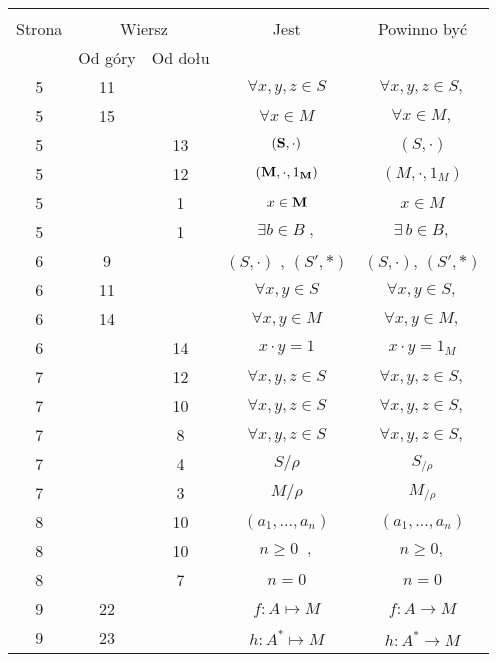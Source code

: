 \documentclass[a4paper,11pt]{article}
\begin{document}
\begin{center}

  \begin{tabular}{|c|c|c|c|c|}
    \hline
    & \multicolumn{2}{c|}{} & & \\
    Strona & \multicolumn{2}{c|}{Wiersz} & Jest
                              & Powinno być \\ \cline{2-3}
    & Od góry & Od dołu & & \\
    \hline
    5  & 11 & & $\forall x, y, z \in S$ & $\forall x, y, z \in S,$ \\
    5  & 15 & & $\forall x \in M$ & $\forall x \in M,$ \\
    5  & & 13 & $( \textrm{\textbf{S}}, \cdot )$ & $( S, \cdot )$ \\
    5  & & 12 & $( \textrm{\textbf{M}}, \cdot, 1_{ \textrm{\textbf{M}}} )$
           & $( M, \cdot, 1_{ M } )$ \\
    5  & &  1 & $x \in \textrm{\textbf{M}}$ & $x \in M$ \\
    5  & &  1 & $\exists b \in B\; ,$ & $\exists \, b \in B,$ \\
    6  &  9 & & $( S, \cdot )${ }, { }{ }$( S', \ast )$
           & $( S, \cdot )$, $( S', \ast )$ \\
    6  & 11 & & $\forall x, y \in S$ & $\forall x, y \in S,$ \\
    6  & 14 & & $\forall x, y \in M$ & $\forall x, y \in M,$ \\
    6  & & 14 & $x \cdot y = 1$ & $x \cdot y = 1_{ M }$ \\
    7  & & 12 & $\forall x, y, z \in S$ & $\forall x, y, z \in S,$ \\
    7  & & 10 & $\forall x, y, z \in S$ & $\forall x, y, z \in S,$ \\
    7  & &  8 & $\forall x, y, z \in S$ & $\forall x, y, z \in S,$ \\
    7  & &  4 & $S / \rho$ & $S_{ / \rho }$ \\
    7  & &  3 & $M / \rho$ & $M_{ / \rho }$ \\
    8  & & 10 & $( a_{ 1 }, ..., a_{ n } )$ & $( a_{ 1 }, \ldots, a_{ n } )$ \\
    8  & & 10 & $n \geq 0\;\;,$ & $n \geq 0,$ \\
    8  & &  7 & $n \!\! = \!\! 0$ & $n = 0$ \\
    9  & 22 & & $f : A \mapsto M$ & $f : A \to M$ \\
    9  & 23 & & $h : A^{ * } \mapsto M$ & $h : A^{ * } \to M$ \\

\end{tabular}
\end{center}
\end{document}
